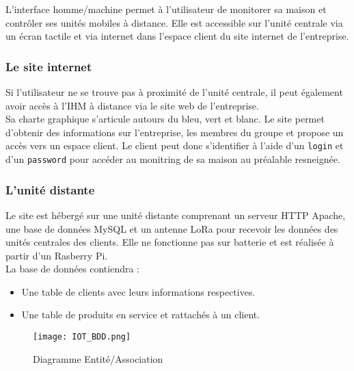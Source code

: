 \documentclass[11pt]{scrartcl} %
\begin{document}
L'interface homme/machine permet à l'utilisateur de monitorer sa maison et contrôler ses unités mobiles à distance. Elle est accessible sur l'unité centrale via un écran tactile et via internet dans l'espace client du site internet de l'entreprise.

\subsubsection{Le site internet}

Si l'utilisateur ne se trouve pas à proximité de l'unité centrale, il peut également avoir accès à l'IHM à distance via le site web de l'entreprise.\\
Sa charte graphique s'articule autours du bleu, vert et blanc. Le site permet d'obtenir des informations sur l'entreprise, les membres du groupe et propose un accès vers un espace client. Le client peut donc s'identifier à l'aide d'un \texttt{login} et d'un \texttt{password} pour accéder au monitring de sa maison au préalable resneignée.

\subsubsection{L'unité distante}

Le site est hébergé sur une unité distante comprenant un serveur HTTP Apache, une base de données MySQL et un antenne LoRa pour recevoir les données des unités centrales des clients. Elle ne fonctionne pas sur batterie et est réalisée à partir d'un Rasberry Pi.\\
La base de données contiendra :
\begin{itemize}
	\item{Une table de clients avec leurs informations respectives.}
	\item{Une table de produits en service et rattachés à un client.}
\end{itemize}

\begin{figure}[h] %
	\centering
	\texttt{[image: IOT\_BDD.png]} %
	\caption{Diagramme Entité/Association}
\end{figure}
\end{document}
